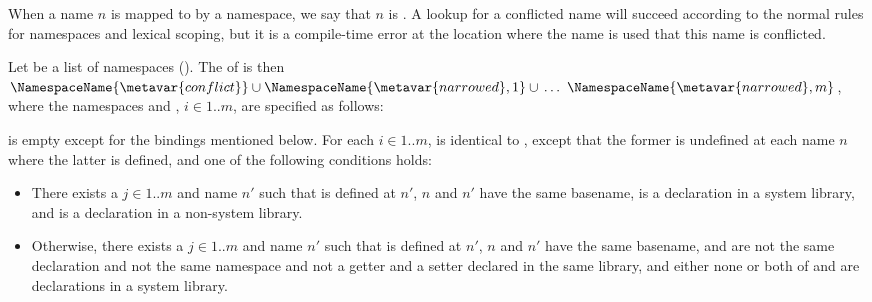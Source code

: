 \documentclass[makeidx]{article}
\begin{document}
{\LMHash{}%
When a name $n$ is mapped to \ConflictValue{} by a namespace,
we say that $n$ is
.
A lookup for a conflicted name will succeed according to
the normal rules for namespaces and lexical scoping,
but it is a compile-time error at the location where the name is used
that this name is conflicted.

\LMHash{}%
Let  be a list of namespaces
().
The
of  is then
$\NamespaceName{\metavar{conflict}} \cup
\NamespaceName{\metavar{narrowed},1} \cup\,
\ldots\ \NamespaceName{\metavar{narrowed},m}$,
where the namespaces  and
, $i \in 1 .. m$,
are specified as follows:

\LMHash{}%
 is empty except for the
bindings mentioned below.
For each $i \in 1 .. m$,
 is identical to ,
except that the former is undefined at each name $n$ where
the latter is defined,
and one of the following conditions holds:

\begin{itemize}
\item There exists a $j \in 1 .. m$ and name $n'$ such that
   is defined at $n'$,
  $n$ and $n'$ have the same basename,
   is a declaration in a system library,
  and  is a declaration in a non-system library.
\item Otherwise, there exists a $j \in 1 .. m$ and name $n'$ such that
   is defined at $n'$,
  $n$ and $n'$ have the same basename,
   and  are not the same declaration
  and not the same namespace
  and not a getter and a setter declared in the same library,
  and either none or both of
   and 
  are declarations in a system library.


\end{itemize}}
\end{document}
